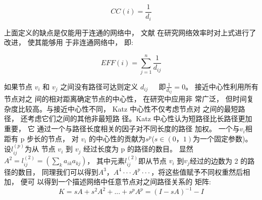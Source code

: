 \[CC(i) = \frac{1}{{{d_i}}}\]

				上面定义的缺点是仅能用于连通的网络中， 文献\parencite{Latora2001Efficient} 在研究网络效率时对上式进行了改进， 使其能够用 于非连通网络中， 即:

\[EFF(i) = \sum\limits_{j = 1}^n {\frac{1}{{{d_{ij}}}}} \]

				如果节点  $v_i$  和  $v_j$  之间没有路径可达则定义 $d_{ij}$  ， 即$\frac{1}{d_{ij}}=0$。 接近中心性利用所有节点对之 间的相对距离确定节点的中心性， 在研究中应用非 常广泛， 但时间复杂度比较高。与接近中心性不同， Katz 中心性不仅考虑节点对 之间的最短路径， 还考虑它们之间的其他非最短路 径\parencite{Katz1953A}。Katz 中心性认为短路径比长路径更加重要， 它 通过一个与路径长度相关的因子对不同长度的路径 加权。 一个与$v_i$相距有 p 步长的节点， 对 $v_i$ 的中心性的贡献为$s^p$($s\in(0，1)$为一个固定参数)。 设$l_{ij}^{(p)}$为从 节点 $v_i$ 到 $v_j$ 经过长度为 p 的路径的数目。 显然 $A^2 =l_{ij}^{(2)}=(\sum\limits_k {a_{ik}a_{kj}})$， 其中元素$l_{ij}^{(2)}$即从节点 $v_i$ 到$v_j$经过的边数为 2 的路径的数目， 同理我们可以得到$A^3， A^4···A^p···， $将这些值赋予不同权重然后相加， 便可 以得到一个描述网络中任意节点对之间路径关系的 矩阵:
\[K = sA + {s^2}{A^2} + ... + {s^p}{A^p} = {(I - sA)^{ - 1}} - I\]

